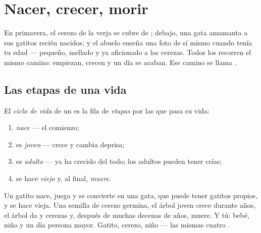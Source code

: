 \chapter{Nacer, crecer, morir}\label{ch:g2:born-grow-die}

En primavera, el cerezo de la verja se cubre de ; debajo, una
gata amamanta a sus gatitos recién nacidos; y el abuelo enseña una
foto de sí mismo cuando tenía tu edad --- pequeño, mellado y ya
aficionado a las cerezas. Todos los  recorren el mismo
camino: empiezan, crecen y un día se acaban. Ese camino se llama
.

\section{Las etapas de una vida}

\begin{definition}\label{def:g2:born-grow-die:cycle}
El \emph{ciclo de vida} de un  es la
fila de \emph{etapas} por las que pasa su vida:
\begin{enumerate}
  \item \emph{nace} --- el comienzo;
  \item es \emph{joven} --- crece y cambia deprisa;
  \item es \emph{adulto} --- ya ha crecido del todo;
        los adultos pueden tener crías;
  \item se hace \emph{viejo} y, al final,
        \emph{muere}.
\end{enumerate}
\end{definition}

\begin{example}\label{ex:g2:born-grow-die:three}
Un gatito nace, juega y se convierte en una gata, que puede tener
gatitos propios, y se hace vieja. Una semilla de cerezo germina, el
árbol joven crece durante años, el árbol  da  y cerezas y,
después de muchas decenas de años, muere. Y tú: bebé, niño y un día
persona mayor. Gatito, cerezo, niño --- las mismas cuatro .
\end{example}

